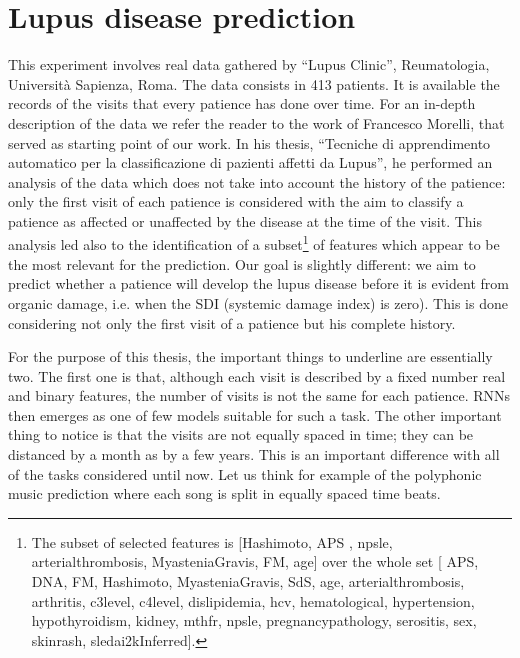 \section{Lupus disease prediction}

This experiment involves real data gathered by ``Lupus Clinic'', Reumatologia, Università Sapienza, Roma. The data consists in 413 patients. It is available the records of the visits that every patience has done over time. For an in-depth description of the data we refer the reader to the work of Francesco Morelli, that served as starting point of our work. In his thesis, ``Tecniche di apprendimento automatico per la classificazione di pazienti affetti da Lupus'', he performed an analysis of the data which does not take into account the history of the patience: only the first visit of each patience is considered with the aim to classify a patience as affected or unaffected by the disease at the time of the visit. This analysis led also to the identification of a subset\footnote{The subset of selected features is [Hashimoto, APS , npsle, arterialthrombosis, MyasteniaGravis, FM, age] over the whole set [ APS, DNA, FM, Hashimoto, MyasteniaGravis, SdS, age, arterialthrombosis, arthritis, c3level, c4level, dislipidemia, hcv, hematological, hypertension, hypothyroidism, kidney, mthfr, npsle, pregnancypathology, serositis, sex, skinrash, sledai2kInferred].} of features which appear to be the most relevant for the prediction. Our goal is slightly different: we aim to predict whether a patience will develop the lupus disease before it is evident from organic damage, i.e. when the SDI (systemic damage index) is zero). This is done considering not only the first visit of a patience but his complete history.

For the purpose of this thesis, the important things to underline are essentially two. The first one is that,  although each visit is described by a fixed number real and binary features, the number of visits  is not the same for each patience. RNNs then emerges as one of few models suitable for such a task. The other important thing to notice is that the visits are not equally spaced in time; they can be distanced by a month as by a few years. This is an important difference with all of the tasks considered until now. Let us think for example of the polyphonic music prediction where each song is split in equally spaced time beats.


